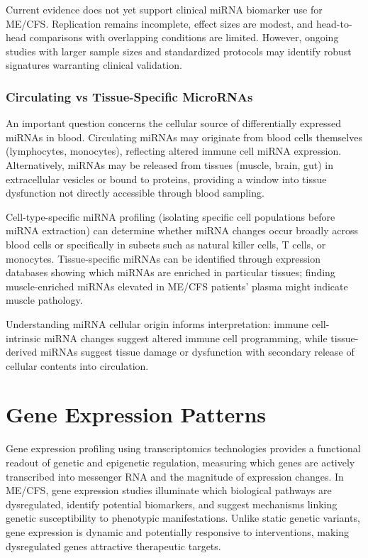 Current evidence does not yet support clinical miRNA biomarker use for ME/CFS. Replication remains incomplete, effect sizes are modest, and head-to-head comparisons with overlapping conditions are limited. However, ongoing studies with larger sample sizes and standardized protocols may identify robust signatures warranting clinical validation.

\subsubsection{Circulating vs Tissue-Specific MicroRNAs}

An important question concerns the cellular source of differentially expressed miRNAs in blood. Circulating miRNAs may originate from blood cells themselves (lymphocytes, monocytes), reflecting altered immune cell miRNA expression. Alternatively, miRNAs may be released from tissues (muscle, brain, gut) in extracellular vesicles or bound to proteins, providing a window into tissue dysfunction not directly accessible through blood sampling.

Cell-type-specific miRNA profiling (isolating specific cell populations before miRNA extraction) can determine whether miRNA changes occur broadly across blood cells or specifically in subsets such as natural killer cells, T cells, or monocytes. Tissue-specific miRNAs can be identified through expression databases showing which miRNAs are enriched in particular tissues; finding muscle-enriched miRNAs elevated in ME/CFS patients' plasma might indicate muscle pathology.

Understanding miRNA cellular origin informs interpretation: immune cell-intrinsic miRNA changes suggest altered immune cell programming, while tissue-derived miRNAs suggest tissue damage or dysfunction with secondary release of cellular contents into circulation.

\section{Gene Expression Patterns}
\label{sec:gene-expression}

Gene expression profiling using transcriptomics technologies provides a functional readout of genetic and epigenetic regulation, measuring which genes are actively transcribed into messenger RNA and the magnitude of expression changes. In ME/CFS, gene expression studies illuminate which biological pathways are dysregulated, identify potential biomarkers, and suggest mechanisms linking genetic susceptibility to phenotypic manifestations. Unlike static genetic variants, gene expression is dynamic and potentially responsive to interventions, making dysregulated genes attractive therapeutic targets.

